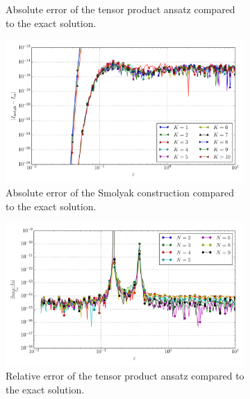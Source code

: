 \documentclass[a4paper,10pt]{article}
\begin{document}
\begin{figure}[ht!]
\begin{subfigure}[t]{0.5\linewidth}
    \caption{Absolute error of the tensor product ansatz compared to the exact solution.}
    \label{fig:tp_sg_3d_conv_eps_222_222_err_nsd_tp}
  \end{subfigure}
  \begin{subfigure}[t]{0.5\linewidth}
    \includegraphics[width=\linewidth]{./plots/tp_sg_3d_conv_eps_(2,2,2)_(2,2,2)_err_nsd_gk.pdf}
    \caption{Absolute error of the Smolyak construction compared to the exact solution.}
    \label{fig:tp_sg_3d_conv_eps_222_222_err_nsd_gk}
  \end{subfigure}
  \begin{subfigure}[t]{0.5\linewidth}
    \includegraphics[width=\linewidth]{./plots/tp_sg_3d_conv_eps_(2,2,2)_(2,2,2)_err_rel_nsd_tp.pdf}
    \caption{Relative error of the tensor product ansatz compared to the exact solution.}
    \label{fig:tp_sg_3d_conv_eps_222_222_err_rel_nsd_tp}
  \end{subfigure}
  \begin{subfigure}[t]{0.5\linewidth}

\end{subfigure}
\end{figure}
\end{document}
